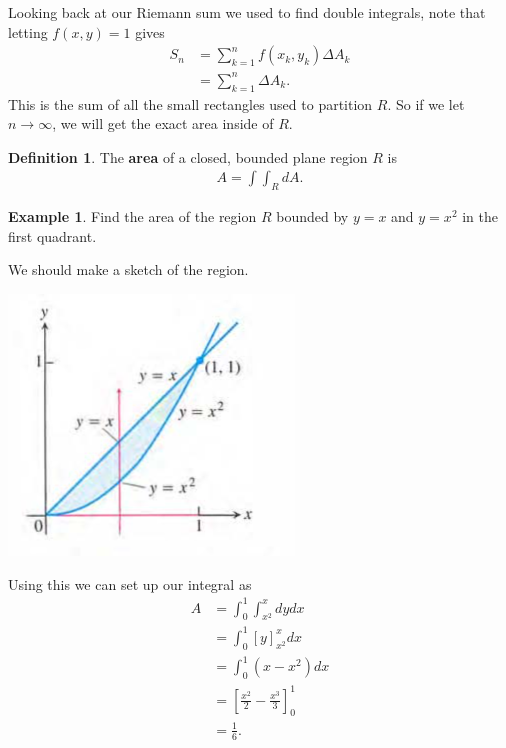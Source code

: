 \documentclass[12pt, letter]{article}
\theoremstyle{plain}
\numberwithin{theorem}{section}
\theoremstyle{definition}
\newtheorem{definition}[theorem]{Definition}
\newtheorem{example}[theorem]{Example}
\begin{document}
Looking back at our Riemann sum we used to find double integrals, note that letting $f(x,y)=1$ gives
\begin{align*}
S_n &= \sum_{k=1}^n f(x_k,y_k)\Delta A_k\\
&= \sum_{k=1}^n \Delta A_k.
\end{align*}
This is the sum of all the small rectangles used to partition $R$. So if we let $n \to \infty$, we will get the exact area inside of $R$.

\bigskip

\begin{definition}
The \textbf{area} of a closed, bounded plane region $R$ is
\begin{align*}
A = \int \int_R dA.
\end{align*}
\end{definition}

\bigskip

\hrulefill

\bigskip

\begin{example}
Find the area of the region $R$ bounded by $y=x$ and $y=x^2$ in the first quadrant.

\bigskip

We should make a sketch of the region.

\bigskip

\begin{center}
\includegraphics[scale=0.7]{m3_f9}
\end{center}

\bigskip

Using this we can set up our integral as
\begin{align*}
A &= \int_0^1 \int_{x^2}^x dy dx\\
&= \int_0^1 \left[ y\right]_{x^2}^x dx\\
&= \int_0^1 (x-x^2)dx\\
&= \left[ \frac{x^2}{2} - \frac{x^3}{3} \right]_0^1\\
&= \frac{1}{6}.
\end{align*}

\end{example}
\end{document}
